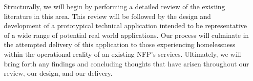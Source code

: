 Structurally, we will begin by performing a detailed review of the existing literature in this area. This review will be followed by the design and development of a prototypical technical application intended to be representative of a wide range of potential real world applications. Our process will culminate in the attempted delivery of this application to those experiencing homelessness within the operational reality of an existing NFP's services. Ultimately, we will bring forth any findings and concluding thoughts that have arisen throughout our review, our design, and our delivery.